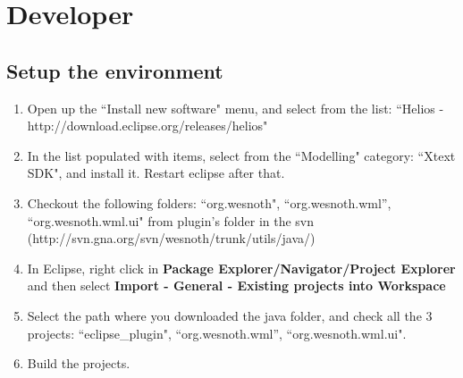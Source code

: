 \documentclass[10pt]{article}
\begin{document}
\section{Developer}
\subsection{Setup the environment}
\begin{enumerate}
\item Open up the ``Install new software" menu, and select from the list: ``Helios - http://download.eclipse.org/releases/helios"
\item In the list populated with items, select from the ``Modelling" category: ``Xtext SDK", and install it. Restart eclipse after that.
\item Checkout the following folders: ``org.wesnoth", ``org.wesnoth.wml'', ``org.wesnoth.wml.ui" from plugin's folder in the svn (http://svn.gna.org/svn/wesnoth/trunk/utils/java/)
\item In Eclipse, right click in \textbf{Package Explorer/Navigator/Project Explorer} and then select \textbf{Import - General - Existing projects into Workspace}
\item Select the path where you downloaded the java folder, and check all the 3 projects: ``eclipse\_plugin", ``org.wesnoth.wml'', ``org.wesnoth.wml.ui".
\item Build the projects.
\end{enumerate}
\end{document}
